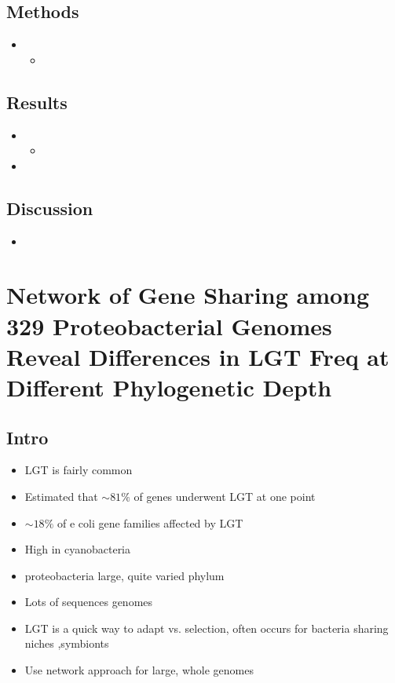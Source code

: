 \documentclass[10pt,letter]{article}
\begin{document}
\subsection*{Methods}
\begin{itemize}
    \item
    \begin{itemize}
        \item
    \end{itemize}
\end{itemize}
\subsection*{Results}
\begin{itemize}
    \item
    \begin{itemize}
        \item
    \end{itemize}
    \item
\end{itemize}
\subsection*{Discussion}
\begin{itemize}
    \item
\end{itemize}
\section*{Network of Gene Sharing among 329 Proteobacterial Genomes Reveal Differences in LGT Freq at Different Phylogenetic Depth\cite{}}
\subsection*{Intro}
\begin{itemize}
    \item LGT is fairly common
    \item Estimated that $\sim81\%$ of genes underwent LGT at one point
    \item $\sim18\%$ of e coli gene families affected by LGT
    \item High in cyanobacteria
    \item proteobacteria large, quite varied phylum
    \item Lots of sequences genomes
    \item LGT is a quick way to adapt vs. selection, often occurs for bacteria sharing niches ,symbionts
    \item Use network approach for large, whole genomes
\end{itemize}
\end{document}
